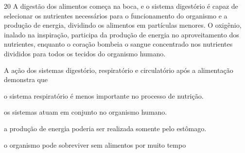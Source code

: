 
\num{20} A digestão dos alimentos começa na boca, e o sistema
digestório é capaz de selecionar os nutrientes necessários para o
funcionamento do organismo e a produção de energia, dividindo os
alimentos em partículas menores. O oxigênio, inalado na inspiração,
participa da produção de energia no aproveitamento dos nutrientes,
enquanto o coração bombeia o sangue concentrado nos nutrientes divididos
para todos os tecidos do organismo humano.

A ação dos sistemas digestório, respiratório e circulatório após a
alimentação demonstra que

\begin{escolha}
\item o sistema respiratório é menos importante no processo de nutrição.

\item os sistemas atuam em conjunto no organismo humano.

\item a produção de energia poderia ser realizada somente pelo estômago.

\item o organismo pode sobreviver sem alimentos por muito tempo
\end{escolha}

